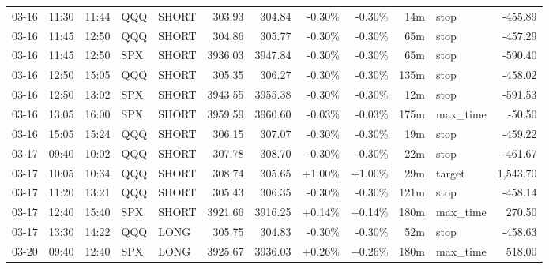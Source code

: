 \documentclass[11pt,a4paper,twoside]{article}
\begin{document}
\begin{center}
\begin{longtable}{>{\color{txtmain}}l l l l l r r r r r >{\color{txtmain}}l r}
03-16 & 11:30 & 11:44 & QQQ & SHORT & 303.93 & 304.84 & \textcolor{lossred}{-0.30\%} & \textcolor{lossred}{-0.30\%} & 14m & stop & \textcolor{lossred}{-455.89} \\
03-16 & 11:45 & 12:50 & QQQ & SHORT & 304.86 & 305.77 & \textcolor{lossred}{-0.30\%} & \textcolor{lossred}{-0.30\%} & 65m & stop & \textcolor{lossred}{-457.29} \\
03-16 & 11:45 & 12:50 & SPX & SHORT & 3936.03 & 3947.84 & \textcolor{lossred}{-0.30\%} & \textcolor{lossred}{-0.30\%} & 65m & stop & \textcolor{lossred}{-590.40} \\
03-16 & 12:50 & 15:05 & QQQ & SHORT & 305.35 & 306.27 & \textcolor{lossred}{-0.30\%} & \textcolor{lossred}{-0.30\%} & 135m & stop & \textcolor{lossred}{-458.02} \\
03-16 & 12:50 & 13:02 & SPX & SHORT & 3943.55 & 3955.38 & \textcolor{lossred}{-0.30\%} & \textcolor{lossred}{-0.30\%} & 12m & stop & \textcolor{lossred}{-591.53} \\
03-16 & 13:05 & 16:00 & SPX & SHORT & 3959.59 & 3960.60 & \textcolor{lossred}{-0.03\%} & \textcolor{lossred}{-0.03\%} & 175m & max\_time & \textcolor{lossred}{-50.50} \\
03-16 & 15:05 & 15:24 & QQQ & SHORT & 306.15 & 307.07 & \textcolor{lossred}{-0.30\%} & \textcolor{lossred}{-0.30\%} & 19m & stop & \textcolor{lossred}{-459.22} \\
03-17 & 09:40 & 10:02 & QQQ & SHORT & 307.78 & 308.70 & \textcolor{lossred}{-0.30\%} & \textcolor{lossred}{-0.30\%} & 22m & stop & \textcolor{lossred}{-461.67} \\
03-17 & 10:05 & 10:34 & QQQ & SHORT & 308.74 & 305.65 & \textcolor{wingreen}{+1.00\%} & \textcolor{wingreen}{+1.00\%} & 29m & target & \textcolor{wingreen}{1,543.70} \\
03-17 & 11:20 & 13:21 & QQQ & SHORT & 305.43 & 306.35 & \textcolor{lossred}{-0.30\%} & \textcolor{lossred}{-0.30\%} & 121m & stop & \textcolor{lossred}{-458.14} \\
03-17 & 12:40 & 15:40 & SPX & SHORT & 3921.66 & 3916.25 & \textcolor{wingreen}{+0.14\%} & \textcolor{wingreen}{+0.14\%} & 180m & max\_time & \textcolor{wingreen}{270.50} \\
03-17 & 13:30 & 14:22 & QQQ & LONG & 305.75 & 304.83 & \textcolor{lossred}{-0.30\%} & \textcolor{lossred}{-0.30\%} & 52m & stop & \textcolor{lossred}{-458.63} \\
03-20 & 09:40 & 12:40 & SPX & LONG & 3925.67 & 3936.03 & \textcolor{wingreen}{+0.26\%} & \textcolor{wingreen}{+0.26\%} & 180m & max\_time & \textcolor{wingreen}{518.00} \\

\end{longtable}
\end{center}
\end{document}

